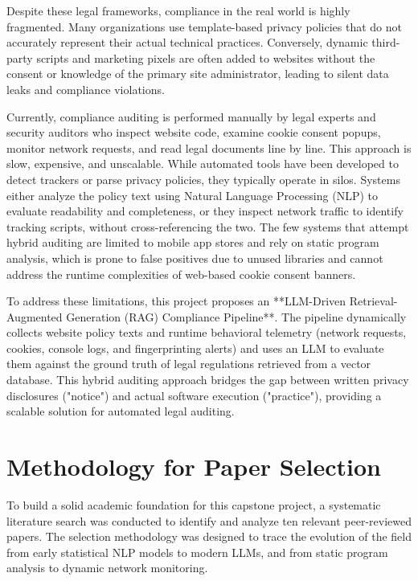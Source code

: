 \documentclass[11pt,a4paper]{article}
\begin{document}
Despite these legal frameworks, compliance in the real world is highly fragmented. Many organizations use template-based privacy policies that do not accurately represent their actual technical practices. Conversely, dynamic third-party scripts and marketing pixels are often added to websites without the consent or knowledge of the primary site administrator, leading to silent data leaks and compliance violations.

Currently, compliance auditing is performed manually by legal experts and security auditors who inspect website code, examine cookie consent popups, monitor network requests, and read legal documents line by line. This approach is slow, expensive, and unscalable. While automated tools have been developed to detect trackers or parse privacy policies, they typically operate in silos. Systems either analyze the policy text using Natural Language Processing (NLP) to evaluate readability and completeness, or they inspect network traffic to identify tracking scripts, without cross-referencing the two. The few systems that attempt hybrid auditing are limited to mobile app stores and rely on static program analysis, which is prone to false positives due to unused libraries and cannot address the runtime complexities of web-based cookie consent banners.

To address these limitations, this project proposes an **LLM-Driven Retrieval-Augmented Generation (RAG) Compliance Pipeline**. The pipeline dynamically collects website policy texts and runtime behavioral telemetry (network requests, cookies, console logs, and fingerprinting alerts) and uses an LLM to evaluate them against the ground truth of legal regulations retrieved from a vector database. This hybrid auditing approach bridges the gap between written privacy disclosures ("notice") and actual software execution ("practice"), providing a scalable solution for automated legal auditing.

\section{Methodology for Paper Selection}
To build a solid academic foundation for this capstone project, a systematic literature search was conducted to identify and analyze ten relevant peer-reviewed papers. The selection methodology was designed to trace the evolution of the field from early statistical NLP models to modern LLMs, and from static program analysis to dynamic network monitoring.
\end{document}
